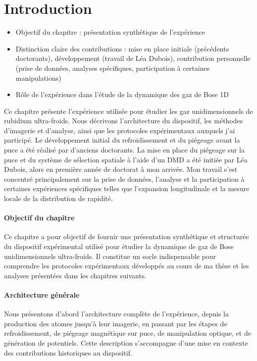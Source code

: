 \section*{Introduction}

\begin{itemize}
	\item Objectif du chapitre : présentation synthétique de l’expérience
	\item Distinction claire des contributions : mise en place initiale (précédents doctorants), développement (travail de Léa Dubois), contribution personnelle (prise de données, analyses spécifiques, participation à certaines manipulations)
	\item Rôle de l’expérience dans l’étude de la dynamique des gaz de Bose 1D
\end{itemize}

Ce chapitre présente l’expérience utilisée pour étudier les gaz unidimensionnels de rubidium ultra-froids. Nous décrivons l’architecture du dispositif, les méthodes d’imagerie et d’analyse, ainsi que les protocoles expérimentaux auxquels j’ai participé. Le développement initial du refroidissement et du piégeage avant la puce a été réalisé par d’anciens doctorants. La mise en place du piégeage sur la puce et du système de sélection spatiale à l’aide d’un DMD a été initiée par Léa Dubois, alors en première année de doctorat à mon arrivée. Mon travail s’est concentré principalement sur la prise de données, l’analyse et la participation à certaines expériences spécifiques telles que l’expansion longitudinale et la mesure locale de la distribution de rapidité.


\paragraph{Objectif du chapitre}  
Ce chapitre a pour objectif de fournir une présentation synthétique et structurée du dispositif expérimental utilisé pour étudier la dynamique de gaz de Bose unidimensionnels ultra-froids. Il constitue un socle indispensable pour comprendre les protocoles expérimentaux développés au cours de ma thèse et les analyses présentées dans les chapitres suivants.

\paragraph{Architecture générale}  
Nous présentons d'abord l’architecture complète de l’expérience, depuis la production des atomes jusqu’à leur imagerie, en passant par les étapes de refroidissement, de piégeage magnétique sur puce, de manipulation optique, et de génération de potentiels. Cette description s’accompagne d’une mise en contexte des contributions historiques au dispositif.

